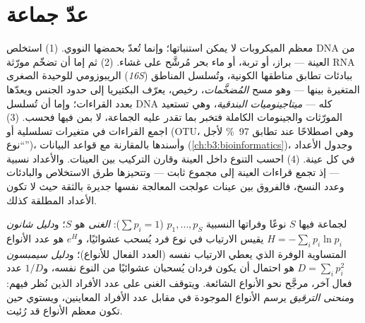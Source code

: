 \section{عدّ جماعة}

\begin{method}\label{met:b3:microbiomes:16s}
معظم الميكروبات لا يمكن استنباتها؛ وإنما تُعدّ بحمضها
النووي. (1) استخلص DNA من العينة --- براز، أو تربة، أو ماء
بحر مُرشَّح على غشاء. (2) ثم إما أن تضخّم مورّثة RNA
الريبوزومي للوحيدة الصغرى (\emph{16S}) ببادئات تطابق
مناطقها الكونية، وتُسلسل المناطق المتغيرة بينها --- وهو
مسح \emph{المُضخَّمات}، رخيص، يعرّف البكتيريا إلى حدود
الجنس ويعدّها بعدد القراءات؛ وإما أن تُسلسل DNA كله ---
\emph{ميتاجينوميات البندقية}، وهي تستعيد المورّثات
والجينومات الكاملة فتخبر بما تقدر عليه الجماعة، لا بمن
فيها فحسب. (3) اجمع القراءات في متغيرات تسلسلية أو
\emph{} (OTU، وهي اصطلاحًا عند تطابق
\qty{97}{\%} لأجل ``نوع'')، وأسندها بالمقارنة مع قواعد
البيانات (\cref{ch:b3:bioinformatics})، وجدول الأعداد في كل
عينة. (4) احسب التنوع داخل العينة وقارن التركيب بين
العينات. والأعداد نسبية --- إذ تجمع قراءات العينة إلى مجموع
ثابت --- وتتحيزها طرق الاستخلاص والبادئات وعدد النسخ،
فالفروق بين عينات عولجت المعالجة نفسها جديرة بالثقة حيث لا
تكون الأعداد المطلقة كذلك.
\end{method}

\begin{definition}[التنوع]\label{def:b3:microbiomes:diversity}
لجماعة فيها $S$ نوعًا وفراتها النسبية $p_{1},\dots,
p_{S}$ ($\sum p_{i} = 1$): \emph{الغنى} هو $S$؛ و\emph{دليل
شانون} $H = -\sum_{i} p_{i}\ln p_{i}$ يقيس الارتياب في نوع
فرد يُسحب عشوائيًا، و$e^{H}$ هو عدد الأنواع المتساوية
الوفرة الذي يعطي الارتياب نفسه (العدد الفعال للأنواع)؛
و\emph{دليل سيمبسون} $D = \sum_{i} p_{i}^{2}$ هو احتمال أن
يكون فردان يُسحبان عشوائيًا من النوع نفسه، و$1/D$ عدد فعال
آخر، مرجَّح نحو الأنواع الشائعة. ويتوقف الغنى على عدد
الأفراد الذين نُظر فيهم: و\emph{منحنى الترقيق} يرسم
الأنواع الموجودة في مقابل عدد الأفراد المعاينين، ويستوي حين
تكون معظم الأنواع قد رُئيت.
\end{definition}


